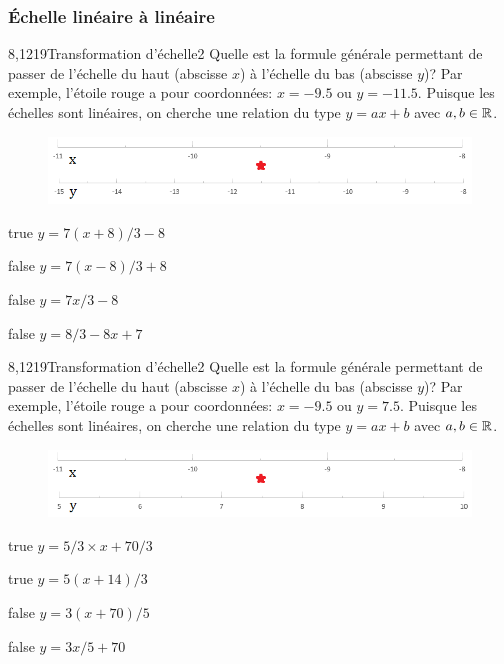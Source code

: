         \subsubsection{Échelle linéaire à linéaire}
			\begin{question}{8,1219}{Transformation d'échelle}{2}{}
				Quelle est la formule générale permettant de passer de l'échelle du haut (abscisse $x$) à l'échelle du bas (abscisse $y$)? Par exemple, l'étoile rouge a pour coordonnées: $x=\num{-9.5}$ ou $y=\num{-11.5}$. Puisque les échelles sont linéaires, on cherche une relation du type $y = ax+b$ avec $a,b\in\mathbb {R} $.
				\begin{figure}
					\centering
					\includegraphics[scale=.75]{Antoine/Figures_Antoine/lin_-11_-8_to_lin_-15_-8_star_-9d5_-11d5.png}
				\end{figure}
			\end{question}
			\begin{reponses}
				\item[true] $y = 7(x+8)/3-8$
				\item[false] $y = 7(x-8)/3+8$
				\item[false] $y = 7x/3-8$
				\item[false] $y = 8/3-8x+7$
			\end{reponses}
			\begin{question}{8,1219}{Transformation d'échelle}{2}{}
				Quelle est la formule générale permettant de passer de l'échelle du haut (abscisse $x$) à l'échelle du bas (abscisse $y$)? Par exemple, l'étoile rouge a pour coordonnées: $x=\num{-9.5}$ ou $y=\num{7.5}$. Puisque les échelles sont linéaires, on cherche une relation du type $y = ax+b$ avec $a,b\in\mathbb {R} $.
				\begin{figure}
					\centering
					\includegraphics[scale=.75]{Antoine/Figures_Antoine/lin_-11_-8_to_lin_5_10_star_-9d5_7d5.png}
				\end{figure}
			\end{question}
			\begin{reponses}
				\item[true] $y = 5/3\times x+70/3$
				\item[true] $y = 5(x+14)/3$
				\item[false] $y = 3(x+70)/5$
				\item[false] $y = 3x/5+70$
			\end{reponses}
